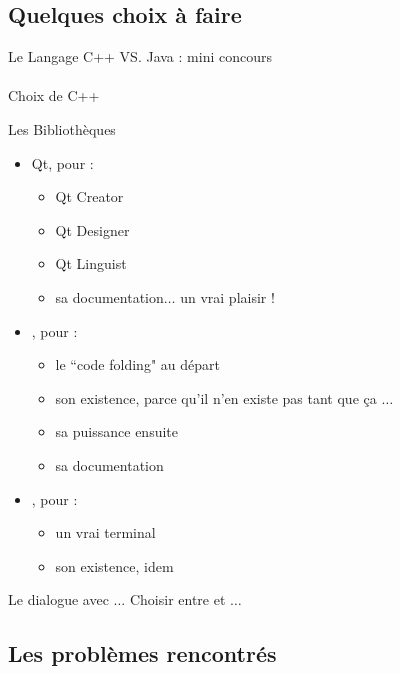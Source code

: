 \subsection{Quelques choix à faire}

    \begin{frame}{Le Langage}
        C++ VS. Java : mini concours
        ~\\
        \pause
        ~\\
        Choix de C++
    \end{frame}
    
    \begin{frame}{Les Bibliothèques}
        \begin{itemize}
        	\item Qt, pour :
        	\begin{itemize}
        		\item Qt Creator
        		\item Qt Designer
        		\item Qt Linguist
        		\item sa documentation$\ldots$ un vrai plaisir !
    		\end{itemize}
    		\item \qcodeedit{}, pour :
        	\begin{itemize}
        		\item le ``code folding" au départ
        		\item son existence, parce qu'il n'en existe pas tant que ça $\ldots$
        		\item sa puissance ensuite
        		\item sa documentation
    		\end{itemize}
    		\item \qtermwidget{}, pour :
        	\begin{itemize}
        		\item un vrai terminal
        		\item son existence, idem
    		\end{itemize}
    	\end{itemize}
	\end{frame}
		
    \begin{frame}{Le dialogue avec \coq{}}
        $\ldots$ Choisir entre \coqtop{} et \coqtop{} $\ldots$
    \end{frame}
        
\subsection{Les problèmes rencontrés}


